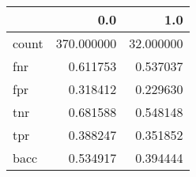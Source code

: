 \begin{tabular}{lrr}
\toprule
{} &         0.0 &        1.0 \\
\midrule
count &  370.000000 &  32.000000 \\
fnr   &    0.611753 &   0.537037 \\
fpr   &    0.318412 &   0.229630 \\
tnr   &    0.681588 &   0.548148 \\
tpr   &    0.388247 &   0.351852 \\
bacc  &    0.534917 &   0.394444 \\
\bottomrule
\end{tabular}
